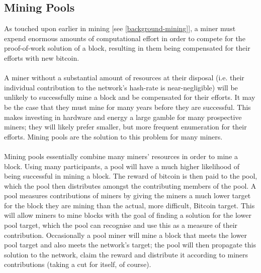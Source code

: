 \subsection{Mining Pools}
As touched upon earlier in mining [see \ref{background-mining}], a miner must expend enormous amounts of computational effort in order to compete for the proof-of-work solution of a block, resulting in them being compensated for their efforts with new bitcoin. 
\\\\
A miner without a substantial amount of resources at their disposal (i.e. their individual contribution to the network's hash-rate is near-negligible) will be unlikely to successfully mine a block and be compensated for their efforts. It may be the case that they must mine for many years before they are successful. This makes investing in hardware and energy a large gamble for many prospective miners; they will likely prefer smaller, but more frequent enumeration for their efforts. Mining pools are the solution to this problem for many miners.
\\\\
Mining pools essentially combine many miners' resources in order to mine a block. Using many participants, a pool will have a much higher likelihood of being successful in mining a block. The reward of bitcoin is then paid to the pool, which the pool then distributes amongst the contributing members of the pool. A pool measures contributions of miners by giving the miners a much lower target for the block they are mining than the actual, more difficult, Bitcoin target. This will allow miners to mine blocks with the goal of finding a solution for the lower pool target, which the pool can recognise and use this as a measure of their contribution. Occasionally a pool miner will mine a block that meets the lower pool target and also meets the network's target; the pool will then propagate this solution to the network, claim the reward and distribute it according to miners contributions (taking a cut for itself, of course). 

